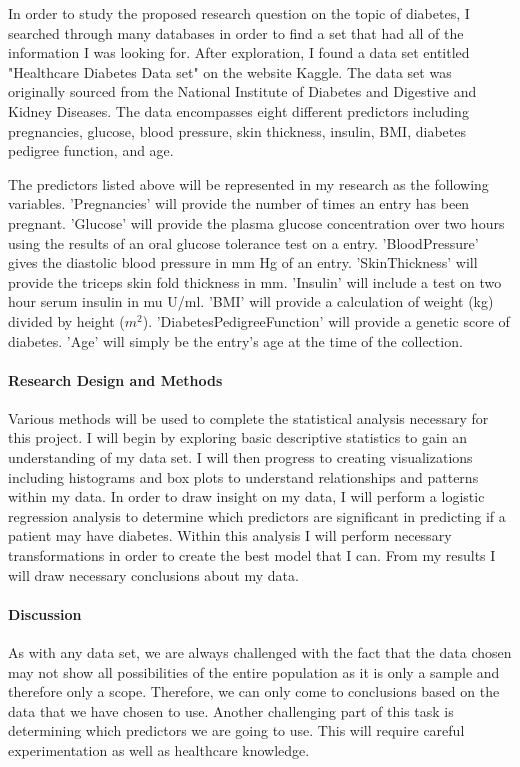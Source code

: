 \documentclass[12pt]{article}
\begin{document}
In order to study the proposed research question on the topic of diabetes, I searched through many databases in order to find a set that had all of the information I was looking for. After exploration, I found a data set entitled "Healthcare Diabetes Data set" on the website Kaggle. The data set was originally sourced from the National Institute of Diabetes and Digestive and Kidney Diseases. The data encompasses eight different predictors including pregnancies, glucose, blood pressure, skin thickness, insulin, BMI, diabetes pedigree function, and age.

The predictors listed above will be represented in my research as the following variables. 'Pregnancies' will provide the number of times an entry has been pregnant. 'Glucose' will provide the plasma glucose concentration over two hours using the results of an oral glucose tolerance test on a entry. 'BloodPressure' gives the diastolic blood pressure in mm Hg of an entry. 'SkinThickness' will provide the triceps skin fold thickness in mm. 'Insulin' will include a test on two hour serum insulin in mu U/ml. 'BMI' will provide a calculation of weight (kg) divided by height ($m^2$). 'DiabetesPedigreeFunction' will provide a genetic score of diabetes. 'Age' will simply be the entry's age at the time of the collection. 



\paragraph{Research Design and Methods}
Various methods will be used to complete the statistical analysis necessary for this project. I will begin by exploring basic descriptive statistics to gain an understanding of my data set. I will then progress to creating visualizations including histograms and box plots to understand relationships and patterns within my data. In order to draw insight on my data, I will perform a logistic regression analysis to determine which predictors are significant in predicting if a patient may have diabetes. Within this analysis I will perform necessary transformations in order to create the best model that I can. From my results I will draw necessary conclusions about my data.


\paragraph{Discussion}

As with any data set, we are always challenged with the fact that the data chosen may not show all possibilities of the entire population as it is only a sample and therefore only a scope. Therefore, we can only come to conclusions based on the data that we have chosen to use. Another challenging part of this task is determining which predictors we are going to use. This will require careful experimentation as well as healthcare knowledge.
\end{document}
